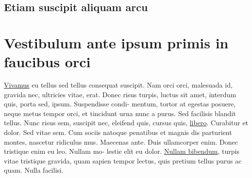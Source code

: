 \documentclass[10pt]{extarticle}
\newenvironment{importantlisting}
{\mdframed[middlelinewidth=0.5pt, middlelinecolor=MatisseColor, skipabove=15pt]{\textbf{Important:}}}
{\endmdframed\vspace{12pt}}
\begin{document}
\begin{importantlisting}
\lipsum[23]
\end{importantlisting}

\subsection{Etiam suscipit aliquam arcu}

\lipsum[24]

\begin{importantlisting}
\lipsum[25]
\end{importantlisting}

\lipsum[26]

\section{Vestibulum ante ipsum primis in faucibus orci}

\href{https://github.com/izydor86/AppleDocumentationStyleLatexTemplate}{Vivamus} eu tellus sed tellus consequat suscipit. Nam orci orci, malesuada id, gravida nec, ultricies vitae, erat. Donec risus turpis, luctus sit amet, interdum quis, porta sed, ipsum. Suspendisse condi- mentum, tortor at egestas posuere, neque metus tempor orci, et tincidunt urna nunc a purus. Sed facilisis blandit tellus. Nunc risus sem, suscipit nec, eleifend quis, cursus quis, \href{https://github.com/izydor86/AppleDocumentationStyleLatexTemplate}{libero}. Curabitur et dolor. Sed vitae sem. Cum sociis natoque penatibus et magnis dis parturient montes, nascetur ridiculus mus. Maecenas ante. Duis ullamcorper enim. Donec tristique enim eu leo. Nullam mo- lestie elit eu dolor. \href{https://github.com/izydor86/AppleDocumentationStyleLatexTemplate}{Nullam bibendum}, turpis vitae tristique gravida, quam sapien tempor lectus, quis pretium tellus purus ac quam. Nulla facilisi.
\end{document}
